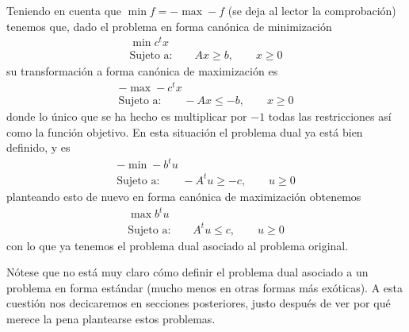 \begin{exa}[Minimización]
	\label{dual_exa_min}
	Teniendo en cuenta que $\min f = -\max -f$ (se deja al lector la comprobación) tenemos que, dado el problema en forma canónica de minimización
	\begin{equation*}
		\begin{array}{c}
			\min c^tx\\
			\text{Sujeto a:}\qquad Ax\geq b,\qquad x\geq 0
		\end{array}
	\end{equation*}
	su transformación a forma canónica de maximización es
	\begin{equation*}
		\begin{array}{c}
			-\max -c^tx\\
			\text{Sujeto a:}\qquad -Ax\leq -b,\qquad x\geq 0
		\end{array}
	\end{equation*}
	donde lo único que se ha hecho es multiplicar por $-1$ todas las restricciones así como la función objetivo. En esta situación el problema dual ya está bien definido, y es
	\begin{equation*}
		\begin{array}{c}
			-\min -b^tu\\
			\text{Sujeto a:}\qquad -A^tu\geq -c,\qquad u\geq 0
		\end{array}
	\end{equation*}
	planteando esto de nuevo en forma canónica de maximización obtenemos
	\begin{equation*}
		\begin{array}{c}
			\max b^tu\\
			\text{Sujeto a:}\qquad A^tu\leq c,\qquad u\geq 0
		\end{array}
	\end{equation*}
	con lo que ya tenemos el problema dual asociado al problema original.
\end{exa}
Nótese que no está muy claro cómo definir el problema dual asociado a un problema en forma estándar (mucho menos en otras formas más exóticas). A esta cuestión nos decicaremos en secciones posteriores, justo después de ver por qué merece la pena plantearse estos problemas.
